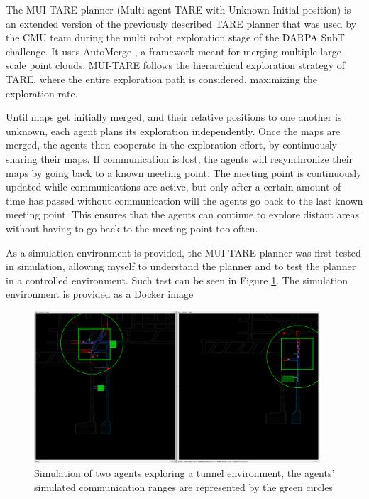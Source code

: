 \documentclass[12pt]{article}
\begin{document}
        The MUI-TARE planner \cite{yan2023mui} (Multi-agent TARE with Unknown Initial position) is an extended version of the previously described TARE planner that was used by the CMU team during the multi robot exploration stage of the DARPA SubT challenge. It uses AutoMerge \cite{yin2023automerge}, a framework meant for merging multiple large scale point clouds. MUI-TARE follows the hierarchical exploration strategy of TARE, where the entire exploration path is considered, maximizing the exploration rate.

        Until maps get initially merged, and their relative positions to one another is unknown, each agent plans its exploration independently. Once the maps are merged, the agents then cooperate in the exploration effort, by continuously sharing their maps. If communication is lost, the agents will resynchronize their maps by going back to a known meeting point. The meeting point is continuously updated while communications are active, but only after a certain amount of time has passed without communication will the agents go back to the last known meeting point. This ensures that the agents can continue to explore distant areas without having to go back to the meeting point too often. 


        As a simulation environment is provided, the MUI-TARE planner was first tested in simulation, allowing myself to understand the planner and to test the planner in a controlled environment. Such test can be seen in Figure \ref{fig:mui_tare_simulation}. The simulation environment is provided as a Docker image



        \begin{figure}
            \centering
            \includegraphics[width=0.95\textwidth]{Images/mtare_sim.png}
            \caption{Simulation of two agents exploring a tunnel environment, the agents' simulated communication ranges are represented by the green circles}
            \label{fig:mui_tare_simulation}
        \end{figure}
\end{document}
